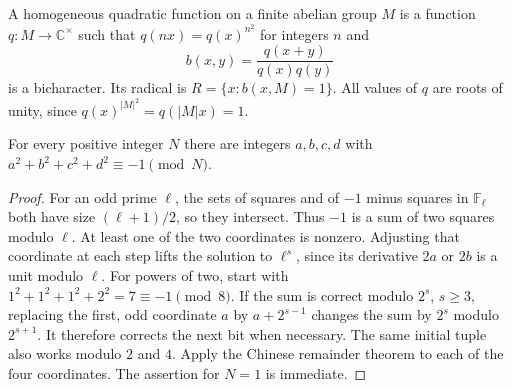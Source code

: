 A homogeneous quadratic function on a finite abelian group $M$
is a function $q:M\to\mathbb C^\times$ such that
$q(nx)=q(x)^{n^2}$ for integers $n$ and
\[
                b(x,y)=\frac{q(x+y)}{q(x)q(y)}
 \tag{TC15}
\]
is a bicharacter.  Its radical is
$R=\{x:b(x,M)=1\}$.
All values of $q$ are roots of unity, since
$q(x)^{|M|^2}=q(|M|x)=1$.

\begin{lemma}\label{tc-four-squares-congruence}
For every positive integer $N$ there are integers
$a,b,c,d$ with $a^2+b^2+c^2+d^2\equiv-1\pmod N$.
\end{lemma}
\begin{proof}
For an odd prime $\ell$, the sets of squares and of $-1$
minus squares in $\mathbb F_\ell$ both have size
$(\ell+1)/2$, so they intersect.  Thus $-1$ is a sum of
two squares modulo $\ell$.  At least one of the two
coordinates is nonzero.  Adjusting that coordinate at each
step lifts the solution to $\ell^s$, since its derivative
$2a$ or $2b$ is a unit modulo $\ell$.
For powers of two, start with
$1^2+1^2+1^2+2^2=7\equiv-1\pmod8$.
If the sum is correct modulo $2^s$, $s\ge3$, replacing
the first, odd coordinate $a$ by $a+2^{s-1}$ changes
the sum by $2^s$ modulo $2^{s+1}$.  It therefore corrects
the next bit when necessary.  The same initial tuple
also works modulo $2$ and $4$.
Apply the Chinese remainder theorem to each of the four
coordinates.  The assertion for $N=1$ is immediate.
\end{proof}

